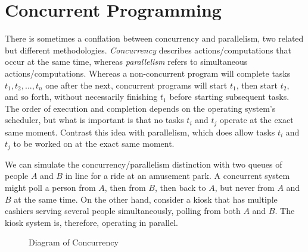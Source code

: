 \section{Concurrent Programming}

There is sometimes a conflation between concurrency and parallelism, two related but different methodologies. \textit{Concurrency} describes actions/computations that occur at the same time, whereas \textit{parallelism} refers to simultaneous actions/computations. Whereas a non-concurrent program will complete tasks $t_1, t_2, ..., t_n$ one after the next, concurrent programs will start $t_1$, then start $t_2$, and so forth, without necessarily finishing $t_1$ before starting subsequent tasks. The order of execution and completion depends on the operating system's scheduler, but what is important is that no tasks $t_i$ and $t_j$ operate at the exact same moment. Contrast this idea with parallelism, which does allow tasks $t_i$ and $t_j$ to be worked on at the exact same moment. 

We can simulate the concurrency/parallelism distinction with two queues of people $A$ and $B$ in line for a ride at an amusement park. A concurrent system might poll a person from $A$, then from $B$, then back to $A$, but never from $A$ and $B$ at the same time. On the other hand, consider a kiosk that has multiple cashiers serving several people simultaneously, polling from both $A$ and $B$. The kiosk system is, therefore, operating in parallel. 

\begin{figure}[ht]
\centering
{}
\caption{Diagram of Concurrency}
\end{figure}

